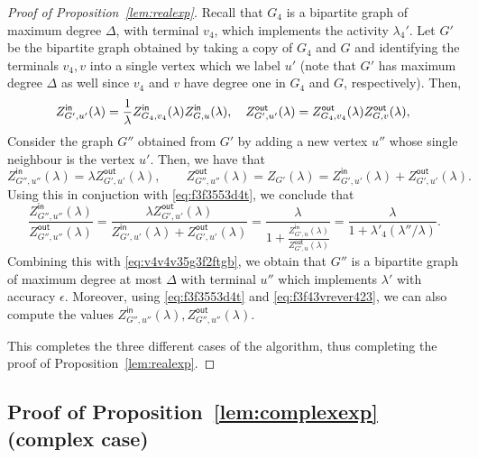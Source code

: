 \documentclass[11pt]{article}
\def\Zin{Z^{\mathsf{in}}}
\def\Zout{Z^{\mathsf{out}}}
\begin{document}
\begin{proof}[Proof of Proposition~\ref{lem:realexp}]
Recall that $G_4$ is a bipartite graph of maximum degree $\Delta$, with terminal $v_4$, which implements the activity $\lambda_4'$. Let $G'$ be the bipartite graph obtained by taking  a copy of $G_4$ and $G$ and identifying the terminals $v_4,v$ into a single vertex which we label $u'$ (note that $G'$  has maximum degree $\Delta$ as well since $v_4$ and $v$ have degree one in $G_4$ and $G$, respectively). Then, 
\begin{equation}\label{eq:f3f3553d4t}
\Zin_{G',u'}(\lambda)=\frac{1}{\lambda}\Zin_{G_4,v_4}(\lambda)\Zin_{G,u}(\lambda), \quad \Zout_{G',u'}(\lambda)= \Zout_{G_4,v_4}(\lambda)\Zout_{G,v}(\lambda),\\
\end{equation}
Consider the graph $G''$ obtained from $G'$ by adding a new vertex $u''$ whose
single neighbour is the vertex $u'$. Then, we have that
\begin{equation}\label{eq:f3f43vrever423}
\Zin_{G'',u''}(\lambda)= \lambda\Zout_{G',u'}(\lambda),\qquad \Zout_{G'',u''}(\lambda)=Z_{G'}(\lambda)=\Zin_{G',u'}(\lambda)+\Zout_{G',u'}(\lambda).
\end{equation}
Using this in conjuction with \eqref{eq:f3f3553d4t}, we conclude that
\[\frac{\Zin_{G'',u''}(\lambda)}{\Zout_{G'',u''}(\lambda)}=\frac{\lambda\Zout_{G',u'}(\lambda)}{\Zin_{G',u'}(\lambda)+\Zout_{G',u'}(\lambda)}=\frac{\lambda}{1+\frac{\Zin_{G',u}(\lambda)}{\Zout_{G',u}(\lambda)}}=\frac{\lambda}{1+ \lambda'_4(\lambda''/\lambda)}.\]
Combining this with \eqref{eq:v4v4v35g3f2ftgb}, we obtain that $G''$ is a bipartite graph of maximum degree at most $\Delta$ with terminal $u''$ which implements $\lambda'$ with accuracy $\epsilon$. Moreover, using \eqref{eq:f3f3553d4t} and \eqref{eq:f3f43vrever423}, we can also compute the values $\Zin_{G'',u''}(\lambda),\Zout_{G'',u''}(\lambda)$.

\vskip 0.2cm

This completes the three different cases of the algorithm, thus completing the proof of Proposition~\ref{lem:realexp}.
\end{proof}

\subsection{Proof of Proposition~\ref{lem:complexexp}  (complex case)}\label{sec:complexexp}
\end{document}
